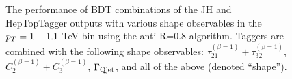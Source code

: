 \begin{figure}
\begin{center}
\caption{The performance of BDT combinations of the JH and HepTopTagger outputs with various shape observables in the $p_T = 1-1.1$ TeV bin using the anti-\kT R=0.8 algorithm. Taggers are combined with the following shape observables: $\tau_{21}^{(\beta=1)}+\tau_{32}^{(\beta=1)}$, $C_{2}^{(\beta=1)}+C_{3}^{(\beta=1)}$, $\Gamma_{\rm Qjet}$, and all of the above (denoted ``shape'').}
\label{fig:pt1000_allcompare_AKt_R08_TagSh}
\end{center}
\end{figure}

